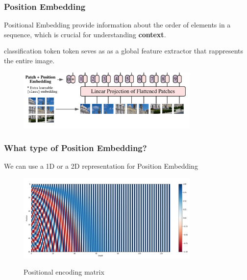 \begin{frame}
\frametitle{Position Embedding}

Positional Embedding provide information about the order of elements in a sequence, which is crucial for understanding \textbf{context}.

\vspace{0.5cm}

classification token token seves as as a global feature extractor that rappresents the entire image.

\begin{figure}[H]  %
    \begin{center}
        \includegraphics[width=0.8\textwidth]{img/2-section/Posizion enbedding.png}
        
    \end{center}
\end{figure}

\end{frame}

\begin{frame}
\frametitle{What type of Position Embedding?}

We can use a 1D or a 2D representation for Position Embedding

\begin{figure}
    \includegraphics[width=0.8\textwidth]{img/2-section/positional_encoding.png} 
    \label{fig:Positional_encoding}
    \caption{Positional encoding matrix}
\end{figure}
\end{frame}

